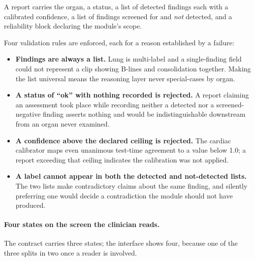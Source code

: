 A report carries the organ, a status, a list of detected findings each with a calibrated
confidence, a list of findings screened for and \emph{not} detected, and a reliability block
declaring the module's scope.

Four validation rules are enforced, each for a reason established by a failure:

\begin{itemize}
  \item \textbf{Findings are always a list.} Lung is multi-label and a single-finding field
        could not represent a clip showing B-lines and consolidation together. Making the list
        universal means the reasoning layer never special-cases by organ.

  \item \textbf{A status of ``ok'' with nothing recorded is rejected.} A report claiming an
        assessment took place while recording neither a detected nor a screened-negative finding
        asserts nothing and would be indistinguishable downstream from an organ never examined.

  \item \textbf{A confidence above the declared ceiling is rejected.} The cardiac calibrator maps
        even unanimous test-time agreement to a value below 1.0; a report exceeding that ceiling
        indicates the calibration was not applied.

  \item \textbf{A label cannot appear in both the detected and not-detected lists.} The two
        lists make contradictory claims about the same finding, and silently preferring one
        would decide a contradiction the module should not have produced.
\end{itemize}

\paragraph{Four states on the screen the clinician reads.} The contract carries three states;
the interface shows four, because one of the three splits in two once a reader is involved.

